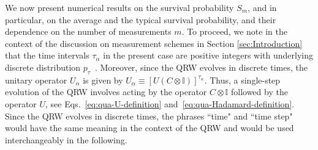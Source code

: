 \documentclass[12pt]{iopart}
\begin{document}
We now present numerical results on the survival
probability $S_m$, and in particular, on the average and the typical
survival probability, and their dependence on the number of measurements $m$.  To proceed, we note in the context of the discussion on measurement schemes in Section \ref{sec:Introduction} that the time intervals $\tau_\alpha$ in the present case are positive integers with underlying discrete distribution $p_\tau$~\cite{ptau}.  Moreover,  since the QRW evolves in discrete times, the unitary operator $U_\alpha$ is given by $U_\alpha \equiv [U (C \otimes \mathbb{I})]^{\tau_\alpha}$.  Thus, a single-step evolution of the QRW  
involves acting by the operator $C \otimes \mathbb{I}$ followed by
the operator $U$, see Eqs.~\eqref{eq:qua-U-definition}
and~\eqref{eq:qua-Hadamard-definition}.  Since the QRW evolves in
discrete times, the phrases ``time" and ``time step" would have the same
meaning in the context of the QRW and would be used interchangeably in
the following.
\end{document}
